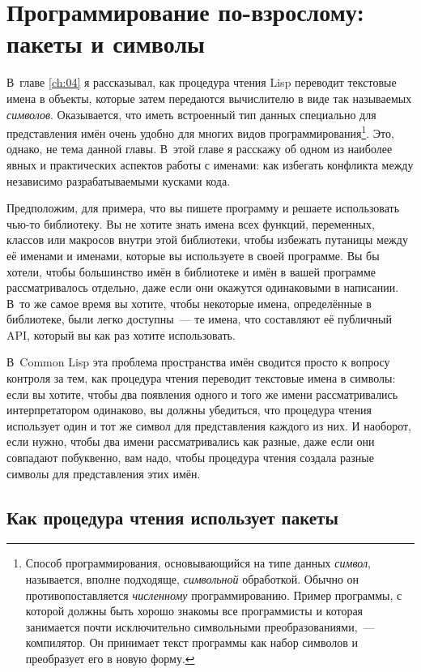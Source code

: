 \chapter{Программирование по-взрослому: пакеты и символы}
\label{ch:21}

\thispagestyle{empty}

В~главе \ref{ch:04} я рассказывал, как процедура чтения Lisp переводит текстовые имена в
объекты, которые затем передаются вычислителю в виде так называемых \textit{символов}.
Оказывается, что иметь встроенный тип данных специально для представления имён очень
удобно для многих видов программирования\footnote{Способ программирования, основывающийся
  на типе данных \textit{символ}, называется, вполне подходяще, \textit{символьной}
  обработкой. Обычно он противопоставляется \textit{численному} программированию.  Пример
  программы, с которой должны быть хорошо знакомы все программисты и которая занимается
  почти исключительно символьными преобразованиями,~--- компилятор. Он принимает текст
  программы как набор символов и преобразует его в новую форму.}. Это, однако, не тема
данной главы. В~этой главе я расскажу об одном из наиболее явных и практических аспектов
работы с именами: как избегать конфликта между независимо разрабатываемыми кусками кода.

Предположим, для примера, что вы пишете программу и решаете использовать чью-то
библиотеку.  Вы не хотите знать имена всех функций, переменных, классов или макросов
внутри этой библиотеки, чтобы избежать путаницы между её именами и именами, которые вы
используете в своей программе. Вы бы хотели, чтобы большинство имён в библиотеке и имён в
вашей программе рассматривалось отдельно, даже если они окажутся одинаковыми в написании.
В~то же самое время вы хотите, чтобы некоторые имена, определённые в библиотеке, были
легко доступны~--- те имена, что составляют её публичный API, который вы как раз хотите
использовать.

В~Common Lisp эта проблема пространства имён сводится просто к вопросу конт\-ро\-ля за тем,
как процедура чтения переводит текстовые имена в символы: если вы хотите, чтобы два появления
одного и того же имени рассматривались интерпретатором одинаково, вы должны убедиться, что
процедура чтения использует один и тот же символ для представления каждого из них. И наоборот,
если нужно, чтобы два имени рассматривались как разные, даже если они совпадают
побуквенно, вам надо, чтобы процедура чтения создала разные символы для представления этих имён.

\section{Как процедура чтения использует пакеты}

